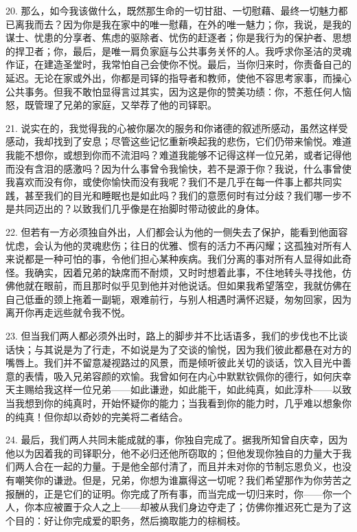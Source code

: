 20. 那么，如今我该做什么，既然那生命的一切甘甜、一切慰藉、最终一切魅力都已离我而去？因为你是我在家中的唯一慰藉，在外的唯一魅力；你，我说，是我的谋士、忧患的分享者、焦虑的驱除者、忧伤的赶逐者；你是我行为的保护者、思想的捍卫者；你，最后，是唯一肩负家庭与公共事务关怀的人。我呼求你圣洁的灵魂作证，在建造圣堂时，我常怕自己会使你不悦。最后，当你归来时，你责备自己的延迟。无论在家或外出，你都是司铎的指导者和教师，使他不容思考家事，而操心公共事务。但我不敢怕显得言过其实，因为这是你的赞美功绩：你，不惹任何人恼怒，既管理了兄弟的家庭，又举荐了他的司铎职。\par

21. 说实在的，我觉得我的心被你屡次的服务和你诸德的叙述所感动，虽然这样受感动，我却找到了安息；尽管这些记忆重新唤起我的悲伤，它们仍带来愉悦。难道我能不想你，或想到你而不流泪吗？难道我能够不记得这样一位兄弟，或者记得他而没有含泪的感激吗？因为什么事曾令我愉快，若不是源于你？我说，什么事曾使我喜欢而没有你，或使你愉快而没有我呢？我们不是几乎在每一件事上都共同实践，甚至我们的目光和睡眠也是如此吗？我们的意愿何时有过分歧？我们哪一步不是共同迈出的？以致我们几乎像是在抬脚时带动彼此的身体。\par

22. 但若有一方必须独自外出，人们都会认为他的一侧失去了保护，能看到他面容忧虑，会认为他的灵魂悲伤；往日的优雅、惯有的活力不再闪耀；这孤独对所有人来说都是一种可怕的事，令他们担心某种疾病。我们分离的事对所有人显得如此奇怪。我确实，因着兄弟的缺席而不耐烦，又时时想着此事，不住地转头寻找他，仿佛他就在眼前，而且那时似乎见到他并对他说话。但如果我希望落空，我就仿佛在自己低垂的颈上拖着一副轭，艰难前行，与别人相遇时满怀迟疑，匆匆回家，因为离开你再走远些就令我不悦。\par

23. 但当我们两人都必须外出时，路上的脚步并不比话语多，我们的步伐也不比谈话快；与其说是为了行走，不如说是为了交谈的愉悦，因为我们彼此都悬在对方的嘴唇上。我们并不留意凝视路过的风景，而是倾听彼此关切的谈话，饮入目光中善意的表情，吸入兄弟容颜的欢愉。我曾如何在内心中默默钦佩你的德行，如何庆幸天主赐给我这样一位兄弟——如此谦逊，如此能干，如此纯真，如此淳朴——以致当我想到你的纯真时，开始怀疑你的能力；当我看到你的能力时，几乎难以想象你的纯真！但你却以奇妙的完美将二者结合。\par

24. 最后，我们两人共同未能成就的事，你独自完成了。据我所知曾自庆幸，因为他以为因着我的司铎职分，他不必归还他所窃取的；但他发现你独自的力量大于我们两人合在一起的力量。于是他全部付清了，而且并未对你的节制忘恩负义，也没有嘲笑你的谦逊。但是，兄弟，你想为谁赢得这一切呢？我们希望那作为你劳苦之报酬的，正是它们的证明。你完成了所有事，而当完成一切归来时，你——你一个人，你本应被置于众人之上——却被从我们身边夺走了；仿佛你推迟死亡是为了这个目的：好让你完成爱的职务，然后摘取能力的棕榈枝。\par

